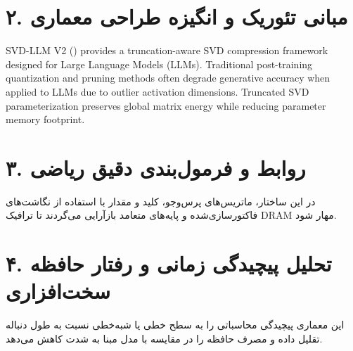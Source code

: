 \documentclass[12pt,a4paper]{article}
\begin{document}
\section*{۲. مبانی تئوریک و انگیزه طراحی معماری}
SVD-LLM V2 () provides a truncation-aware SVD compression framework designed for Large Language Models (LLMs). Traditional post-training quantization and pruning methods often degrade generative accuracy when applied to LLMs due to outlier activation dimensions. Truncated SVD parameterization preserves global matrix energy while reducing parameter memory footprint.

\section*{۳. روابط و فرمول‌بندی دقیق ریاضی}
در این ساختار، ماتریس‌های پرس‌وجو، کلید و مقدار با استفاده از نگاشت‌های فاکتورسازی‌شده و پایه‌های متعامد بازآرایی می‌گردند تا ترافیک DRAM مهار شود.

\section*{۴. تحلیل پیچیدگی زمانی و رفتار حافظه سخت‌افزاری}
این معماری پیچیدگی محاسباتی را به سطح خطی یا شبه‌خطی نسبت به طول دنباله تقلیل داده و مصرف حافظه را در مقایسه با مدل مبنا به شدت کاهش می‌دهد.
\end{document}
